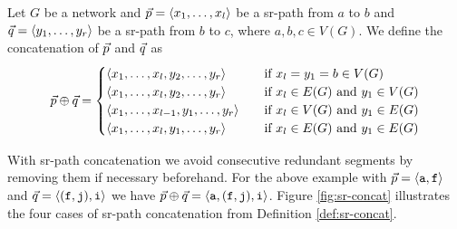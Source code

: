 % 
% 
% 
% 

\begin{definition}
\label{def:sr-concat}
Let $G$ be a network and $\vec{p} = \langle x_1, \ldots, x_l \rangle$ be a sr-path from
$a$ to $b$ and $\vec{q} = \langle y_1, \ldots, y_r \rangle$ be a sr-path from $b$ to $c$, where $a, b, c \in V(G)$.
We  define the concatenation of $\vec{p}$ and $\vec{q}$ as
\[ \vec{p} \oplus \vec{q} =
  \begin{cases}
    \langle x_1, \ldots, x_l, y_2, \ldots, y_r \rangle & \quad \text{if } x_l = y_1 = b \in V(G) \\
    \langle x_1, \ldots, x_l, y_2, \ldots, y_r \rangle & \quad \text{if } x_l \in E(G) \text{ and } y_1 \in V(G) \\
    \langle x_1, \ldots, x_{l - 1}, y_1, \ldots, y_r \rangle & \quad \text{if } x_l \in V(G) \text{ and } y_1 \in E(G) \\
    \langle x_1, \ldots, x_l, y_1, \ldots, y_r \rangle & \quad \text{if } x_l \in E(G) \text{ and } y_1 \in E(G) \\
  \end{cases}
\]
\end{definition}

With sr-path concatenation we avoid consecutive redundant segments by removing them if necessary beforehand.
For the above example with $\vec{p} = \langle \texttt{a}, \texttt{f} \rangle$ and
$\vec{q} = \langle (\texttt{f}, \texttt{j}), \texttt{i} \rangle$ we have 
$\vec{p} \oplus \vec{q} = \langle \texttt{a}, (\texttt{f}, \texttt{j}), \texttt{i} \rangle$. Figure \ref{fig:sr-concat}
illustrates the four cases of sr-path concatenation from Definition \ref{def:sr-concat}.

